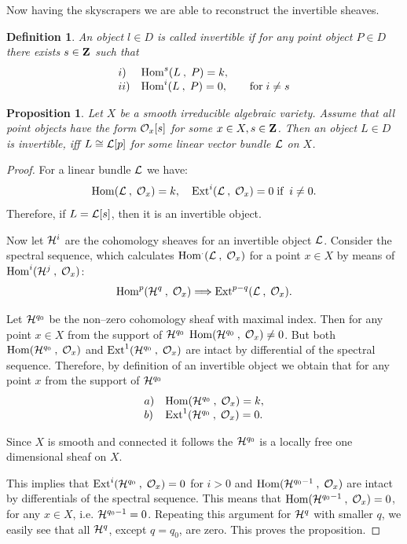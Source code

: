 \documentclass[12pt]{article}
\newtheorem{proposition}[theorem]{Proposition}
\newtheorem{definition}[theorem]{Definition}
\def\o#1{{\cal O}_{#1}}
\begin{document}
Now having the skyscrapers we are able to reconstruct the invertible sheaves.
\begin{definition}\label{invdef}
An {\sf object} $l\in D$ is called {\sf invertible} if for any point object $P\in D$ there exists $s\in {\bf Z}$ such that
$$
\begin{array}{lll}
i)& {\rm Hom}^s(L\:,\; P)=k,&\\
ii)& {\rm Hom}^i(L\:,\; P)=0, & \quad\mbox{for}\;i\ne s\\
\end{array}
$$
\end{definition}
\begin{proposition}\label{rin}
Let $X$ be a smooth irreducible algebraic variety. Assume that all point objects have the form ${\o x}[s]$ for some $x\in X, s\in {\bf Z}$. Then an object $L\in D$ is invertible, iff $L\cong {\cal L}[p]$ for some linear vector bundle ${\cal L}$ on $X$.
\end{proposition}
\begin{proof}
For a linear bundle ${\cal L}$ we have:
$$
{\rm Hom}({\cal L}\:, \;{\o x})=k, \quad{\rm Ext}^i({\cal L}\:, \; {\o x})=0 \;\mbox{if }\:i\ne 0.
$$
Therefore, if $L={\cal L}[s]$, then it is an invertible object.

Now let ${\cal H}^i$ are the cohomology sheaves for an invertible object ${\cal L}$. Consider the spectral sequence, which calculates ${\rm Hom}^.({\cal L}\:, \;{\o x})$ for a point $x\in X$ by means of ${\rm Hom}^i({\cal H}^j\:, \;{\o x})$:
$$
{\rm Hom}^p({\cal H}^q\:, \;{\o x})\Longrightarrow{\rm Ext}^{p-q}({\cal L}\:, \;{\o x}).
$$

Let ${\cal H}^{q_0}$ be the non--zero cohomology sheaf with maximal index. Then for any point $x\in X$ from the support of ${\cal H}^{q_0}$ ${\rm Hom}({\cal H}^{q_0}\:, \;{\o x})\ne 0$. But both  ${\rm Hom}({\cal H}^{q_0}\:, \;{\o x})$ and ${\rm Ext}^1({\cal H}^{q_0}\:, \;{\o x})$ are intact by differential of the spectral sequence. Therefore, by definition of an invertible object we obtain that for any point $x$ from the support of ${\cal H}^{q_0}$ 
$$
\begin{array}{ll}
a)& {\rm Hom}({\cal H}^{q_0}\:,\;{\o x})=k,\\
b)& {\rm Ext}^1({\cal H}^{q_0}\:,\;{\o x})=0.
\end{array}
$$

Since $X$ is smooth and connected it follows the ${\cal H}^{q_0}$ is a locally free one dimensional sheaf on $X$.

This implies that ${\rm Ext}^i({\cal H}^{q_0}\:,\;{\o x})=0$  for $i>0$ and ${\rm Hom}({\cal H}^{q_0-1}\:,\;{\o x})$ are intact by differentials of the spectral sequence. This means that ${\rm Hom}({\cal H}^{q_0-1}\:,\;{\o x})=0$, for any $x\in X$, i.e. ${\cal H}^{q_0-1}=0$. Repeating this argument for ${\cal H}^q$ with smaller $q$, we easily see that all ${\cal H}^q$, except $q=q_0$, are zero. This proves the proposition.
\end{proof}
  
\end{document}
